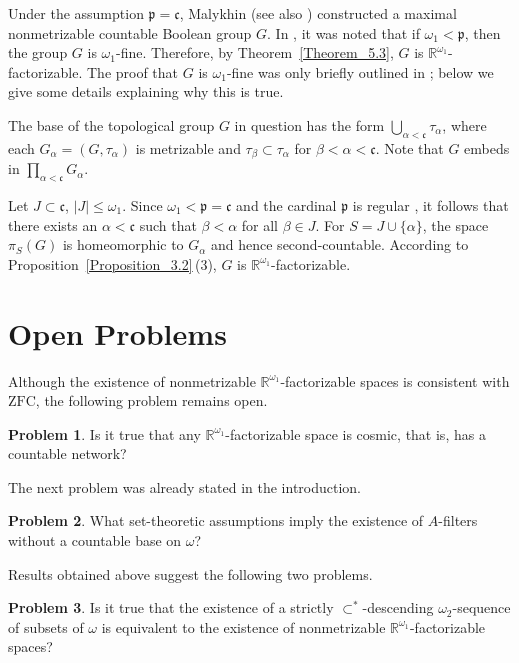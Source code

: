\documentclass[a4paper,12pt]{amsart}
\theoremstyle{definition}
\newtheorem{problem}{Problem}[section]
\theoremstyle{remark}
\begin{document}
Under the assumption $\mathfrak{p}=\mathfrak{c}$, Malykhin \cite{Malykhin1979} 
(see also \cite[Theorem 4.5.22]{A-T}) constructed a maximal nonmetrizable countable Boolean group $G$.
In \cite{HPTZ}, it was noted that if $\omega_1<\mathfrak{p}$, then 
the group $G$ is $\omega_1$-fine.
Therefore, by Theorem~\ref{Theorem_5.3}, $G$ is $\mathbb R^{\omega_1}$-factorizable.
The proof that $G$ is $\omega_1$-fine was only briefly outlined in \cite{HPTZ}; 
below we give some details explaining why this is true.

The base of the topological group $G$ in question has the form  
$\bigcup_{\alpha<\mathfrak{c}}\tau_\alpha$, where each $G_\alpha=(G,\tau_\alpha)$ is metrizable and 
$\tau_\beta\subset \tau_\alpha$ for $\beta<\alpha<\mathfrak{c}$. 
Note that $G$ embeds in $\prod_{\alpha<\mathfrak{c}} G_\alpha$.

Let $J\subset \mathfrak{c}$, $|J|\leq\omega_1$. Since $\omega_1<\mathfrak{p}=\mathfrak{c}$ and 
the cardinal $\mathfrak{p}$ is regular \cite[Theorem 3.1]{vD}, it follows that 
there exists an $\alpha<\mathfrak{c}$ such that $\beta<\alpha$ for all $\beta\in J$. 
For $S=J\cup\{\alpha\}$, the space $\pi_S(G)$ is homeomorphic to $G_\alpha$ and hence second-countable. 
According to Proposition~\ref{Proposition_3.2}\,(3),  $G$ is $\mathbb R^{\omega_1}$-factorizable.


\section{Open Problems}

Although the existence of nonmetrizable $\mathbb R^{\omega_1}$-factorizable spaces is consistent with 
$\mathrm{ZFC}$, the following problem remains open. 

\begin{problem}
Is it true that any $\mathbb R^{\omega_1}$-factorizable space is cosmic, that is, has a countable network? 
\end{problem}

The next problem was already stated in the introduction.

\begin{problem}
What set-theoretic assumptions imply the existence of $A$-filters without a countable base on $\omega$?
\end{problem}

Results obtained above suggest the following two problems. 

\begin{problem}
Is it true that the existence of a strictly $\subset^*$-descending 
$\omega_2$-sequence of subsets of $\omega$ is equivalent to the existence of nonmetrizable 
$\mathbb R^{\omega_1}$-factorizable spaces? 
\end{problem} 
\end{document}
